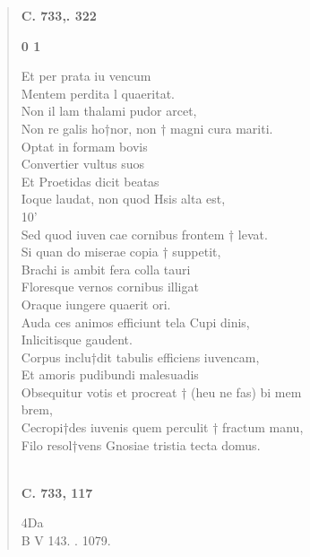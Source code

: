 \documentclass[11pt, a4paper]{report}
\begin{document}
\begin{verse}
    \begin{center} \textbf{C. 733,. 322} \end{center}\begin{center} \textbf{0 1} \end{center}Et per  \lbrack  prata iu vencum  \rbrack  \\ Mentem  \lbrack  perdita l quaeritat.  \rbrack  \\ Non il \lbrack lam thalami pudor  \rbrack  arcet, \\ Non re galis ho†nor, non † magni  \lbrack  cura mariti. \\ Optat in  \lbrack  formam  \lbrack  bovis \\ Convertier vultus  \rbrack  suos  \rbrack  \\ Et Proetidas  \lbrack  dicit beatas  \rbrack  \\ Ioque laudat, non  \lbrack  quod Hsis alta est, \\ 10’ \\ Sed quod  \lbrack  iuven cae cornibus  \lbrack  frontem † levat. \rbrack  \\ Si quan \lbrack do miserae copia † suppetit, \\ Brachi is ambit fera  \lbrack  colla  \lbrack  tauri \\ Floresque vernos  \rbrack  cornibus illigat  \rbrack  \\ Oraque iungere quaerit ori.  \rbrack  \\ Auda ces animos efficiunt tela Cupi \lbrack dinis, \\ Inlicitisque gaudent.  \rbrack  \\ Corpus inclu†dit tabulis efficiens iuvencam,  \rbrack  \\ Et amoris  \rbrack  pudibundi malesuadis \\ Obsequitur votis et  \lbrack  procreat † (heu ne fas) bi mem \\ brem, \rbrack  \\ Cecropi†des iuvenis quem perculit † fractum  \lbrack  manu, \\ Filo  \lbrack  resol†vens Gnosiae tristia tecta domus.  \rbrack  \\ 
        ﻿\pagebreak 
     \marginpar{[218]} \begin{center} \textbf{C. 733, 117} \end{center}4Da \\ B V 143. . 1079. \\ 
      \end{verse}
  
\end{document}
